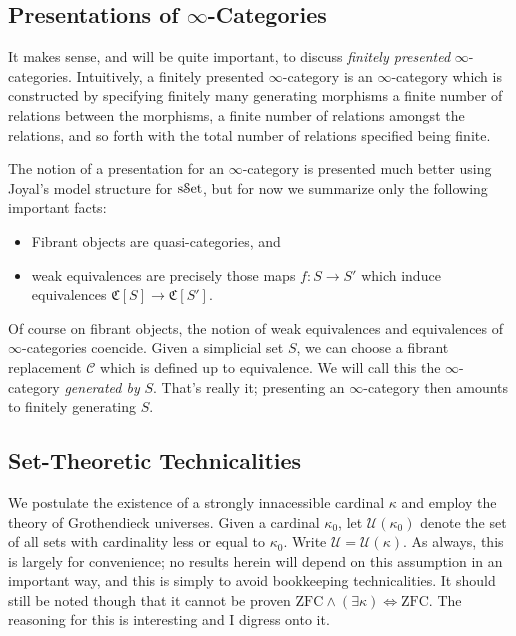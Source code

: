 \subsection{Presentations of $\infty $-Categories}

It makes sense, and will be quite important, to discuss \emph{finitely presented} $\infty $-categories. Intuitively, a finitely presented $\infty $-category is an $\infty $-category which is constructed by specifying finitely many generating morphisms a finite number of relations between the morphisms, a finite number of relations amongst the relations, and so forth with the total number of relations specified being finite.

The notion of a presentation for an $\infty $-category is presented much better using Joyal's model structure for $\mathrm{s}\mathcal{S}\mathrm{et} $, but for now we summarize only the following important facts:
\begin{itemize}
	\item Fibrant objects are quasi-categories, and
	\item weak equivalences are precisely those maps $f : S \to S'$ which induce equivalences $\mathfrak{C} [S]\to \mathfrak{C} [S']$.
\end{itemize}
Of course on fibrant objects, the notion of weak equivalences and equivalences of $\infty $-categories coencide. Given a simplicial set $S$, we can choose a fibrant replacement $\mathcal{C} $ which is defined up to equivalence. We will call this the $\infty $-category \emph{generated by} $S$. That's really it; presenting an $\infty $-category then amounts to finitely generating $S$.

\subsection{Set-Theoretic Technicalities}

We postulate the existence of a strongly innacessible cardinal $\kappa $ and employ the theory of Grothendieck universes. Given a cardinal $\kappa _0$, let $\mathcal{U} (\kappa _0)$ denote the set of all sets with cardinality less or equal to $\kappa _0$. Write $\mathcal{U} =\mathcal{U} (\kappa )$. As always, this is largely for convenience; no results herein will depend on this assumption in an important way, and this is simply to avoid bookkeeping technicalities. It should still be noted though that it cannot be proven $\mathrm{ZFC} \land(\exists \kappa) \iff \mathrm{ZFC} $. The reasoning for this is interesting and I digress onto it.

